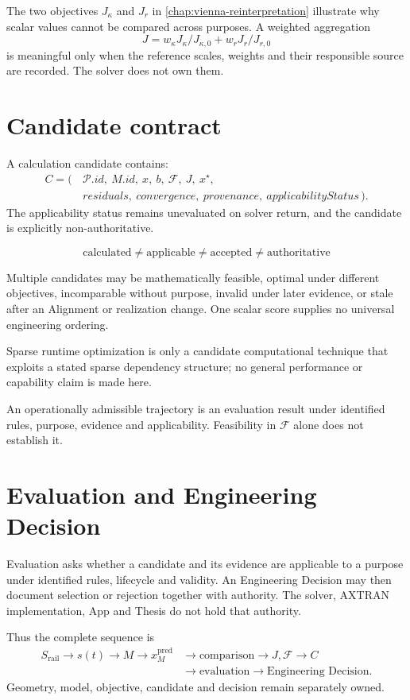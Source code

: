 The two objectives \(J_\kappa\) and \(J_r\) in
\cref{chap:vienna-reinterpretation} illustrate why scalar values cannot be
compared across purposes. A weighted aggregation
\[
J=w_\kappa J_\kappa/J_{\kappa,0}+w_rJ_r/J_{r,0}
\]
is meaningful only when the reference scales, weights and their responsible
source are recorded. The solver does not own them.

\section{Candidate contract}

A calculation candidate contains:
\[
\begin{aligned}
C=(\, &\mathcal P.id,\ M.id,\ x,\ b,\ \mathcal F,\ J,\ x^\star,\\
      &residuals,\ convergence,\ provenance,\ applicabilityStatus\,).
\end{aligned}
\]
The applicability status remains unevaluated on solver return, and the
candidate is explicitly non-authoritative.

\[
\boxed{\text{calculated}
\neq\text{applicable}
\neq\text{accepted}
\neq\text{authoritative}}
\]

Multiple candidates may be mathematically feasible, optimal under different
objectives, incomparable without purpose, invalid under later evidence, or
stale after an Alignment or realization change. One scalar score supplies no
universal engineering ordering.

\begin{definition}
\label{def:sparse-runtime-optimization}
Sparse runtime optimization is only a candidate computational technique that
exploits a stated sparse dependency structure; no general performance or
capability claim is made here.
\end{definition}

\begin{definition}
\label{def:operationally-admissible-trajectory}
An operationally admissible trajectory is an evaluation result under
identified rules, purpose, evidence and applicability. Feasibility in
\(\mathcal F\) alone does not establish it.
\end{definition}

\section{Evaluation and Engineering Decision}

Evaluation asks whether a candidate and its evidence are applicable to a
purpose under identified rules, lifecycle and validity. An Engineering
Decision may then document selection or rejection together with authority.
The solver, AXTRAN implementation, App and Thesis do not hold that authority.

Thus the complete sequence is
\[
\begin{aligned}
S_{\mathrm{rail}}\to s(t)\to M\to x_M^{\mathrm{pred}}
&\to\text{comparison}\to J,\mathcal F\to C\\
&\to\text{evaluation}\to\text{Engineering Decision}.
\end{aligned}
\]
Geometry, model, objective, candidate and decision remain separately owned.

